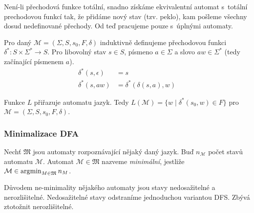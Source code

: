 Není-li přechodová funkce totální, snadno získáme ekvivalentní automat
s~totální prechodovou funkcí tak, že přidáme nový stav (tzv. peklo), kam pošleme
všechny dosud nedefinované přechody. Od teď pracujeme pouze s~úplnými
automaty.

\begin{definition}
    Pro daný $\mathcal{M} = (\Sigma, S, s_0, F, \delta)$
    induktivně definujeme přechodovou funkci
    $\delta^* : S \times \Sigma^* \to S$.
    Pro libovolný stav $s \in S$, písmeno $a \in \Sigma$ a
    slovo $aw \in \Sigma^*$ (tedy začínající písmenem $a$).
\begin{align*}
    \delta^*(s, \epsilon) &= s \\
    \delta^*(s, aw) &= \delta^*(\delta(s,a), w)
\end{align*}
\end{definition}

\begin{definition}
    Funkce $L$ přiřazuje automatu jazyk. Tedy
    $L(\mathcal{M}) = \{ w \mid \delta^*(s_0, w) \in F \}$
    pro $\mathcal{M} = (\Sigma, S, s_0, F, \delta)$.
\end{definition}

\subsubsection{Minimalizace DFA}

\begin{definition}
    Nechť $\mathfrak{M}$ jsou automaty rozpoznávající nějaký daný jazyk.
    Buď $n_\mathcal{M}$ počet stavů automatu $\mathcal{M}$.
    Automat $\mathcal{M} \in \mathfrak{M}$ nazveme {\em minimální},
    jestliže $\mathcal{M} \in \operatorname*{\arg\!\min}_{M \in \mathfrak{M}} n_M$.
\end{definition}

Důvodem ne-minimality nějakého automaty jsou stavy nedosažitelné a nerozlišitelné.
Nedosažitelné stavy odstraníme jednoduchou variantou DFS. Zbývá
ztotožnit nerozlišitelné.



